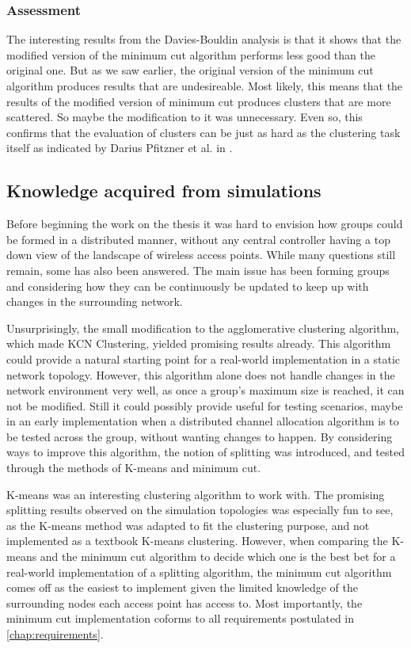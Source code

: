 \subsubsection{Assessment}
The interesting results from the Davies-Bouldin analysis is that it shows that the modified version of the minimum cut algorithm performs less good than the original one.  
But as we saw earlier, the original version of the minimum cut algorithm produces results that are undesireable. Most likely, this means that the results
of the modified version of minimum cut produces clusters that are more scattered. So maybe the modification to it was unnecessary. Even so, this
confirms that the evaluation of clusters can be just as hard as the clustering task itself as indicated by Darius Pfitzner et al. in \cite{fitzner}.


\subsection{Knowledge acquired from simulations}
Before beginning the work on the thesis it was hard to envision how groups could be formed in a distributed manner, without any central controller having a top down view of
the landscape of wireless access points. While many questions still remain, some has also been answered. The main issue
has been forming groups and considering how they can be continuously be updated to keep up with changes in the surrounding network.  

Unsurprisingly, the small modification to the agglomerative clustering algorithm, which made KCN Clustering, yielded promising results already.
This algorithm could provide a natural starting point for a real-world implementation in a static network topology.
However, this algorithm alone does not handle changes in the network environment very well, as once a group's maximum size is reached, it can not be modified. 
Still it could possibly provide useful for testing scenarios, maybe in an early implementation when a distributed channel allocation algorithm is to be tested across the group, without
wanting changes to happen. By considering ways to improve this algorithm, the notion of splitting was introduced, and tested through the methods of K-means and minimum cut.

K-means was an interesting clustering algorithm to work with. The promising splitting results observed on the simulation topologies was especially fun to see, as
the K-means method was adapted to fit the clustering purpose, and not implemented as a textbook K-means clustering.
However, when comparing the K-means and the minimum cut algorithm to decide which one is the best bet for a real-world implementation of a splitting algorithm,
the minimum cut algorithm comes off as the easiest to implement given the limited knowledge of the surrounding nodes each access point has access to.
Most importantly, the minimum cut implementation coforms to all requirements postulated in \ref{chap:requirements}.

